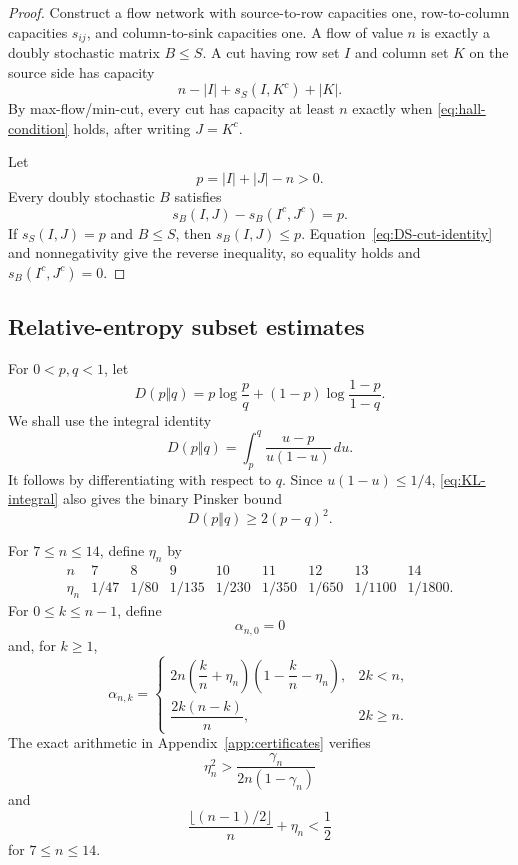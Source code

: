 \documentclass[11pt]{article}
\theoremstyle{definition}
\newcommand{\1}{\mathbf{1}}
\begin{document}
\begin{proof}
Construct a flow network with source-to-row capacities one, row-to-column capacities $s_{ij}$, and column-to-sink capacities one.  A flow of value $n$ is exactly a doubly stochastic matrix $B\le S$.  A cut having row set $I$ and column set $K$ on the source side has capacity
\[
 n-|I|+s_S(I,K^c)+|K|.
\]
By max-flow/min-cut, every cut has capacity at least $n$ exactly when \eqref{eq:hall-condition} holds, after writing $J=K^c$.

Let
\[
 p=|I|+|J|-n>0.
\]
Every doubly stochastic $B$ satisfies
\[
 s_B(I,J)-s_B(I^c,J^c)=p.
 \tag{5.6}\label{eq:DS-cut-identity}
\]
If $s_S(I,J)=p$ and $B\le S$, then $s_B(I,J)\le p$.  Equation~\eqref{eq:DS-cut-identity} and nonnegativity give the reverse inequality, so equality holds and $s_B(I^c,J^c)=0$.
\end{proof}

\subsection{Relative-entropy subset estimates}

For $0<p,q<1$, let
\[
 D(p\Vert q)=p\log\frac pq+(1-p)\log\frac{1-p}{1-q}.
\]
We shall use the integral identity
\[
 D(p\Vert q)=\int_p^q\frac{u-p}{u(1-u)}\,du.
 \tag{5.7}\label{eq:KL-integral}
\]
It follows by differentiating with respect to $q$.  Since $u(1-u)\le1/4$, \eqref{eq:KL-integral} also gives the binary Pinsker bound
\[
 D(p\Vert q)\ge2(p-q)^2.
 \tag{5.8}\label{eq:pinsker}
\]

For $7\le n\le14$, define $\eta_n$ by
\[
\begin{array}{c|cccccccc}
 n&7&8&9&10&11&12&13&14\\ \hline
 \eta_n&1/47&1/80&1/135&1/230&1/350&1/650&1/1100&1/1800.
\end{array}
\tag{5.9}\label{eq:eta-table}
\]
For $0\le k\le n-1$, define
\[
 \alpha_{n,0}=0
\]
and, for $k\ge1$,
\[
 \alpha_{n,k}=
 \begin{cases}
  2n\left(\dfrac{k}{n}+\eta_n\right)
     \left(1-\dfrac{k}{n}-\eta_n\right),&2k<n,\\[3mm]
  \dfrac{2k(n-k)}n,&2k\ge n.
 \end{cases}
 \tag{5.10}\label{eq:alpha-mid}
\]
The exact arithmetic in Appendix~\ref{app:certificates} verifies
\[
 \eta_n^2>\frac{\gamma_n}{2n(1-\gamma_n)}
 \tag{5.11}\label{eq:eta-localization}
\]
and
\[
 \frac{\lfloor(n-1)/2\rfloor}{n}+\eta_n<\frac12
 \tag{5.12}\label{eq:eta-half}
\]
for $7\le n\le14$.
\end{document}

